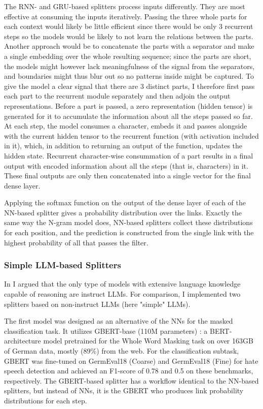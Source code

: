 \documentclass[11pt]{article}
\begin{document}
The RNN- and GRU-based splitters process inputs differently. They are most effective at consuming the inputs iteratively. Passing the three whole parts for each context would likely be little efficient since there would be only 3 recurrent steps so the models would be likely to not learn the relations between the parts. Another approach would be to concatenate the parts with a separator and make a single embedding over the whole resulting sequence; since the parts are short, the models might however lack meaningfulness of the signal from the separators, and boundaries might thus blur out so no patterns inside might be captured. To give the model a clear signal that there are 3 distinct parts, I therefore first pass each part to the recurrent module separately and then adjoin the output representations. Before a part is passed, a zero representation (hidden tensor) is generated for it to accumulate the information about all the steps passed so far. At each step, the model consumes a character, embeds it and passes alongside with the current hidden tensor to the recurrent function (with activation included in it), which, in addition to returning an output of the function, updates the hidden state. Recurrent character-wise consummation of a part results in a final output with encoded information about all the steps (that is, characters) in it. These final outputs are only then concatenated into a single vector for the final dense layer.

Applying the softmax function on the output of the dense layer of each of the NN-based splitter gives a probability distribution over the links. Exactly the same way the N-gram model does, NN-based splitters collect these distributions for each position, and the prediction is constructed from the single link with the highest probability of all that passes the filter.


\subsubsection{Simple LLM-based Splitters}

In  I argued that the only type of models with extensive language knowledge capable of reasoning are instruct LLMs. For comparison, I implemented two splitters based on non-instruct LLMs (here "simple" LLMs).

The first model was designed as an alternative of the NNs for the masked classification task. It utilizes GBERT-base (110M parameters) \cite{chan-etal-2020-germans}: a BERT-architecture \cite{devlin2019bertpretrainingdeepbidirectional} model pretrained for the Whole Word Masking task on over 163GB of German data, mostly (89\%) from the web. For the classification subtask, GBERT was fine-tuned on GermEval18 (Coarse) and GermEval18 (Fine) for hate speech detection \cite{Wiegand} and achieved an F1-score of 0.78 and 0.5 on these benchmarks, respectively. The GBERT-based splitter has a workflow identical to the NN-based splitters, but instead of NNs, it is the GBERT who produces link probability distributions for each step.
\end{document}

